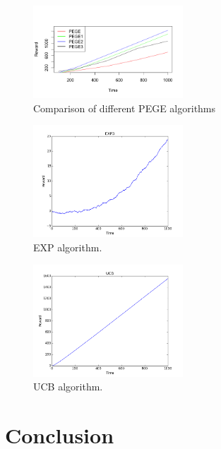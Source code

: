 \documentclass{article}
\theoremstyle{plain}
\theoremstyle{definition}
\begin{document}
\begin{figure}[htb]
{
\centering
\includegraphics[width=0.50\textwidth,]{algo_compare}
\caption{Comparison of different PEGE algorithms \label{fig: tah0}}
}
\end{figure}




\begin{figure}[htb]
{
\centering
\includegraphics[width=0.50\textwidth]{plot11}
\caption{EXP algorithm. \label{fig: tahi}}
}
\end{figure}

\begin{figure}[htb]
{
\centering
\includegraphics[width=0.50\textwidth]{UCB1}
\caption{UCB algorithm. \label{fig: tah2}}
}
\end{figure}






\section{Conclusion}
\end{document}
